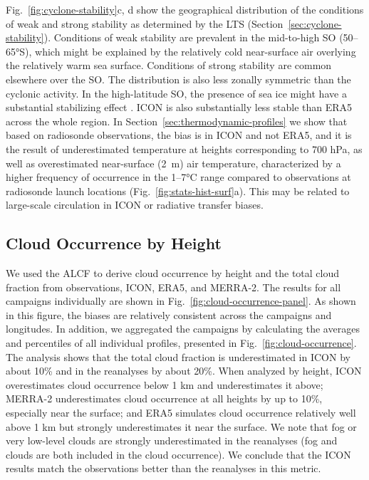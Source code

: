 \documentclass[draft]{agujournal2019}
\begin{document}
Fig.~\ref{fig:cyclone-stability}c, d show the geographical distribution of the conditions of weak and strong stability as determined by the LTS (Section~\ref{sec:cyclone-stability}). Conditions of weak stability are prevalent in the mid-to-high SO (50--65°S), which might be explained by the relatively cold near-surface air overlying the relatively warm sea surface. Conditions of strong stability are common elsewhere over the SO. The distribution is also less zonally symmetric than the cyclonic activity. In the high-latitude SO, the presence of sea ice might have a substantial stabilizing effect \cite{knight2024}. ICON is also substantially less stable than ERA5 across the whole region. In Section~\ref{sec:thermodynamic-profiles} we show that based on radiosonde observations, the bias is in ICON and not ERA5, and it is the result of underestimated temperature at heights corresponding to 700 hPa, as well as overestimated near-surface (2~m) air temperature, characterized by a higher frequency of occurrence in the 1--7°C range compared to observations at radiosonde launch locations (Fig.~\ref{fig:stats-hist-surf}a). This may be related to large-scale circulation in ICON or radiative transfer biases.

\subsection{Cloud Occurrence by Height}
\label{sec:cloud-occurrence}

We used the ALCF to derive cloud occurrence by height and the total cloud fraction from observations, ICON, ERA5, and MERRA-2. The results for all campaigns individually are shown in Fig.~\ref{fig:cloud-occurrence-panel}. As shown in this figure, the biases are relatively consistent across the campaigns and longitudes. In addition, we aggregated the campaigns by calculating the averages and percentiles of all individual profiles, presented in Fig.~\ref{fig:cloud-occurrence}. The analysis shows that the total cloud fraction is underestimated in ICON by about 10\% and in the reanalyses by about 20\%. When analyzed by height, ICON overestimates cloud occurrence below 1 km and underestimates it above; MERRA-2 underestimates cloud occurrence at all heights by up to 10\%, especially near the surface; and ERA5 simulates cloud occurrence relatively well above 1 km but strongly underestimates it near the surface. We note that fog or very low-level clouds are strongly underestimated in the reanalyses (fog and clouds are both included in the cloud occurrence). We conclude that the ICON results match the observations better than the reanalyses in this metric.
\end{document}
